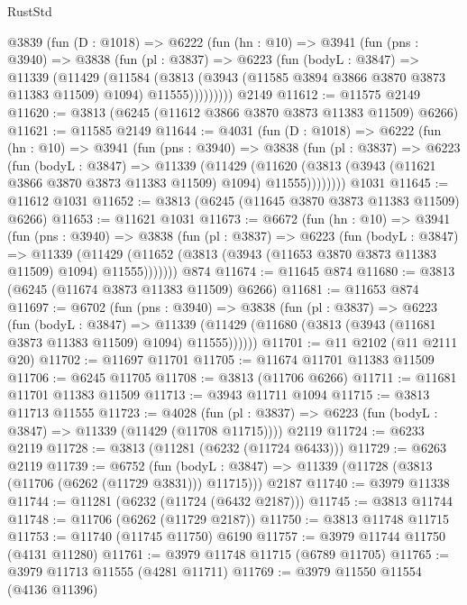 \begin{lexlean}{RustStd}
\begin{coremodule}
{\begin{coremodule}
{{{{{{{{{{{{{{{{{{{{{{{{{{{{{{{{{{{    @3839
      (fun (D : @1018) =>
      @6222
        (fun (hn : @10) =>
        @3941
          (fun (pns : @3940) =>
          @3838
            (fun (pl : @3837) =>
            @6223
              (fun (bodyL : @3847) =>
              @11339
                (@11429
                  (@11584
                    (@3813
                      (@3943 (@11585 @3894 @3866 @3870 @3873 @11383 @11509) @1094)
                      @11555)))))))))
    @2149
@11612 := @11575 @2149
@11620 := @3813 (@6245 (@11612 @3866 @3870 @3873 @11383 @11509) @6266)
@11621 := @11585 @2149
@11644 := @4031
    (fun (D : @1018) =>
    @6222
      (fun (hn : @10) =>
      @3941
        (fun (pns : @3940) =>
        @3838
          (fun (pl : @3837) =>
          @6223
            (fun (bodyL : @3847) =>
            @11339
              (@11429
                (@11620 (@3813 (@3943 (@11621 @3866 @3870 @3873 @11383 @11509) @1094) @11555))))))))
    @1031
@11645 := @11612 @1031
@11652 := @3813 (@6245 (@11645 @3870 @3873 @11383 @11509) @6266)
@11653 := @11621 @1031
@11673 := @6672
    (fun (hn : @10) =>
    @3941
      (fun (pns : @3940) =>
      @3838
        (fun (pl : @3837) =>
        @6223
          (fun (bodyL : @3847) =>
          @11339
            (@11429 (@11652 (@3813 (@3943 (@11653 @3870 @3873 @11383 @11509) @1094) @11555)))))))
    @874
@11674 := @11645 @874
@11680 := @3813 (@6245 (@11674 @3873 @11383 @11509) @6266)
@11681 := @11653 @874
@11697 := @6702
    (fun (pns : @3940) =>
    @3838
      (fun (pl : @3837) =>
      @6223
        (fun (bodyL : @3847) =>
        @11339 (@11429 (@11680 (@3813 (@3943 (@11681 @3873 @11383 @11509) @1094) @11555))))))
@11701 := @11 @2102 (@11 @2111 @20)
@11702 := @11697 @11701
@11705 := @11674 @11701 @11383 @11509
@11706 := @6245 @11705
@11708 := @3813 (@11706 @6266)
@11711 := @11681 @11701 @11383 @11509
@11713 := @3943 @11711 @1094
@11715 := @3813 @11713 @11555
@11723 := @4028
    (fun (pl : @3837) => @6223 (fun (bodyL : @3847) => @11339 (@11429 (@11708 @11715))))
    @2119
@11724 := @6233 @2119
@11728 := @3813 (@11281 (@6232 (@11724 @6433)))
@11729 := @6263 @2119
@11739 := @6752
    (fun (bodyL : @3847) => @11339 (@11728 (@3813 (@11706 (@6262 (@11729 @3831))) @11715)))
    @2187
@11740 := @3979 @11338
@11744 := @11281 (@6232 (@11724 (@6432 @2187)))
@11745 := @3813 @11744
@11748 := @11706 (@6262 (@11729 @2187))
@11750 := @3813 @11748 @11715
@11753 := @11740 (@11745 @11750) @6190
@11757 := @3979 @11744 @11750 (@4131 @11280)
@11761 := @3979 @11748 @11715 (@6789 @11705)
@11765 := @3979 @11713 @11555 (@4281 @11711)
@11769 := @3979 @11550 @11554 (@4136 @11396)
}}}}}}}}}}}}}}}}}}}}}}}}}}}}}}}}}}}
\end{coremodule}}
\end{coremodule}
\end{lexlean}
